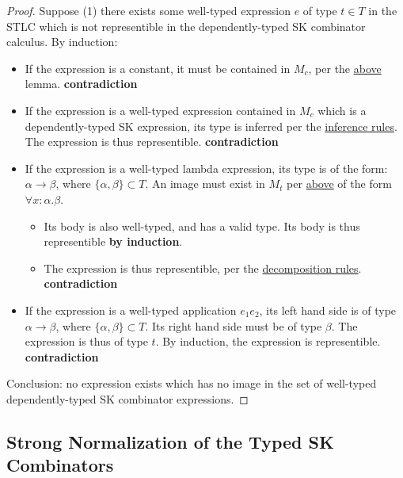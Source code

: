 \documentclass[11pt]{article}
\begin{document}
\begin{proof}
Suppose (1) there exists some well-typed expression $e$ of type $t \in T$ in the STLC which is not representible in the dependently-typed SK combinator calculus. By induction: \\
\begin{itemize}
\item{If the expression is a constant, it must be contained in $M_{c}$, per the \href{maplemma:1}{above} lemma. \textbf{contradiction}} \\
\item{If the expression is a well-typed expression contained in $M_{c}$ which is a dependently-typed SK expression, its type is inferred per the \href{inference:1}{inference rules}. The expression is thus representible. \textbf{contradiction}} \\
\item If the expression is a well-typed lambda expression, its type is of the form: $\alpha \rightarrow \beta$, where $\{\alpha, \beta\} \subset T$. An image must exist in $M_{t}$ per \href{maplemma:1}{above} of the form $\forall x : \alpha.\beta$. \\
\begin{itemize}
  \item{Its body is also well-typed, and has a valid type. Its body is thus representible \textbf{by induction}.} \\
  \item{The expression is thus representible, per the \href{decomplemma:1}{decomposition rules}. \textbf{contradiction}} \\
\end{itemize}
\item{If the expression is a well-typed application $e_{1} e_{2}$, its left hand side is of type $\alpha \rightarrow \beta$, where $\{\alpha, \beta\} \subset T$. Its right hand side must be of type $\beta$. The expression is thus of type $t$. By induction, the expression is representible. \textbf{contradiction}} \\
\end{itemize}

Conclusion: no expression exists which has no image in the set of well-typed dependently-typed SK combinator expressions.
\end{proof}
\subsection{Strong Normalization of the Typed SK Combinators}
\label{sec:org59fa0c4}
\end{document}
